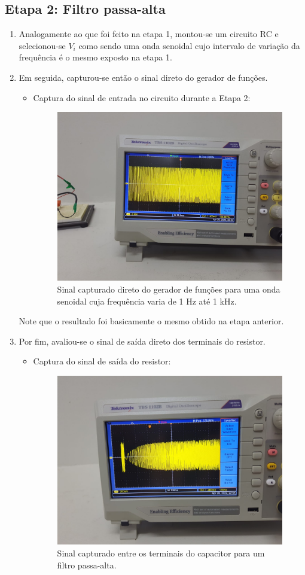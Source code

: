 \documentclass[letterpaper, 12pt]{article}
\begin{document}
\subsection{Etapa 2: Filtro passa-alta}\label{Etapa 2}
\begin{enumerate}
    \item Analogamente ao que foi feito na etapa 1, montou-se um circuito RC e selecionou-se $V_{i}$ como sendo uma onda senoidal cujo intervalo de variação da frequência é o mesmo exposto na etapa 1.
    
    \item Em seguida, capturou-se então o sinal direto do gerador de funções.
    \begin{itemize}
        \item Captura do sinal de entrada no circuito durante a Etapa 2:
        \begin{figure}[h]
            \centering
            \includegraphics[width=0.5\linewidth]{figures/Input_signal2.jpeg}
             \caption{Sinal capturado direto do gerador de funções para uma onda senoidal cuja frequência varia de 1 Hz até 1 kHz.}
            \label{fig:Input_signal-2}
        \end{figure}
    \end{itemize}
    
    Note que o resultado foi basicamente o mesmo obtido na etapa anterior.
    
    \item Por fim, avaliou-se o sinal de saída direto dos terminais do resistor.
    \begin{itemize}
        \item Captura do sinal de saída do resistor:
        \begin{figure}[h]
            \centering
            \includegraphics[width=0.5\linewidth]{figures/Resistor_signal.jpeg}
            \caption{Sinal capturado entre os terminais do capacitor para um filtro passa-alta.}
            \label{fig:High-pass_filter}
        \end{figure}
    \end{itemize}
    

\end{enumerate}
\end{document}

